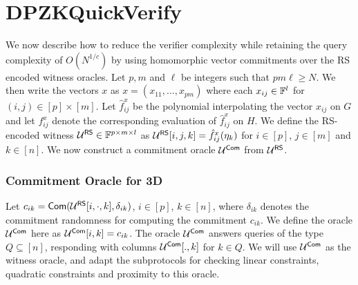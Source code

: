 \section{DPZKQuickVerify} \label{sec:quickverify}

We now describe how to reduce the verifier complexity while retaining the query complexity of $O(N^{1/c})$ by
using homomorphic vector commitments over the RS encoded witness oracles. 
Let $p,m$ and $\ell$ be integers such that $pm\ell\geq N$. 
We then write the vectors $x$ as $x =
(x_{11},\ldots,x_{pm})$ where each $x_{ij}\in \mathbb{F}^l$ for $(i,j)\in [p]\times
[m]$. Let $\hat{f}^x_{ij}$ be the polynomial interpolating the vector $x_{ij}$
on $G$ and let $f^x_{ij}$ denote the corresponding evaluation of
$\hat{f}^x_{ij}$ on $H$. We define the RS-encoded witness $\mathcal{U}^{\mathsf{RS}}\in
\mathbb{F}^{p\times m\times l}$ as $\mathcal{U}^{\mathsf{RS}}[i,j,k]=\hat{f}^x_{ij}(\eta_k)$ for $i\in
[p]$, $j\in [m]$ and $k\in [n]$. We now construct a commitment oracle
$\mathcal{U}^{\mathsf{Com}}$ from $\mathcal{U}^{\mathsf{RS}}$.

\subsubsection{Commitment Oracle for 3D}
Let $c_{ik} = \mathsf{Com}(\mathcal{U}^{\mathsf{RS}}[i,\cdot,k],\delta_{ik})$, $i\in [p]$, $k\in [n]$, where 
$\delta_{ik}$ denotes the commitment randomness for computing the commitment $c_{ik}$. 
We define the oracle $\mathcal{U}^{\mathsf{Com}}$ here as $\mathcal{U}^{\mathsf{Com}}[i,k]=c_{ik}$. The oracle
$\mathcal{U}^{\mathsf{Com}}$ answers queries of the type $Q\subseteq [n]$, responding with
columns $\mathcal{U}^{\mathsf{Com}}[.,k]$ for $k\in Q$. We will use $\mathcal{U}^{\mathsf{Com}}$ as the witness
oracle, and adapt the subprotocols for checking linear constraints, quadratic
constraints and proximity to this oracle.

